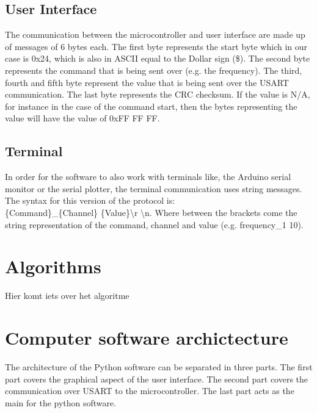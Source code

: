 \documentclass[conference]{IEEEtran}
\begin{document}
\subsection{User Interface}\label{UI_communication}
The communication between the microcontroller and user interface are made up of messages of 6 bytes each. The first byte represents the start byte which in our case is 0x24, which is also in ASCII equal to the Dollar sign (\$). The second byte represents the command that is being sent over (e.g. the frequency). The third, fourth and fifth byte represent the value that is being sent over the USART communication. The last byte represents the CRC checksum. If the value is N/A, for instance in the case of the command start, then the bytes representing the value will have the value of 0xFF FF FF.

\subsection{Terminal}
In order for the software to also work with terminals like, the Arduino serial monitor or the serial plotter, the terminal communication uses string messages. The syntax for this version of the protocol is:
\\ \{Command\}\_\{Channel\} \{Value\}\textbackslash r \textbackslash n. Where between the brackets come the string representation of the command, channel and value (e.g. frequency\_1 10).

\section{Algorithms}
Hier komt iets over het algoritme



\section{Computer software archictecture}

The architecture of the Python software can be separated in three parts. The first part covers the graphical aspect of the user interface. The second part covers the communication over USART to the microcontroller. The last part acts as the main for the python software.
\end{document}

